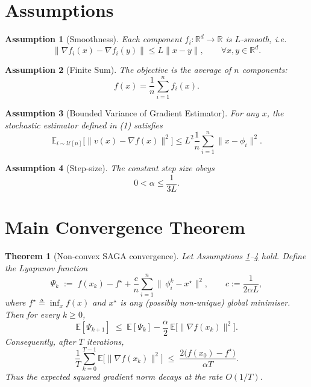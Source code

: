 \documentclass{article}
\newtheorem{theorem}{Theorem}
\newtheorem{assumption}{Assumption}
\newcommand{\E}{\mathbb{E}}
\newcommand{\R}{\mathbb{R}}
\begin{document}
\newpage
\section*{Assumptions}
\begin{assumption}[Smoothness]\label{as:smooth}
Each component $f_i:\R^{d}\to\R$ is $L$‑smooth, i.e.
\[
\|\nabla f_i(x)-\nabla f_i(y)\|\le L\|x-y\|,\qquad\forall x,y\in\R^{d}.
\tag{A1}
\]
\end{assumption}
\begin{assumption}[Finite Sum]\label{as:finite}
The objective is the average of $n$ components:
\[
f(x)=\frac1n\sum_{i=1}^{n}f_i(x).
\tag{A2}
\]
\end{assumption}
\begin{assumption}[Bounded Variance of Gradient Estimator]\label{as:var}
For any $x$, the stochastic estimator defined in (1) satisfies
\[
\E_{i\sim\mathcal{U}[n]}\bigl[\|v(x)-\nabla f(x)\|^{2}\bigr]
\le L^{2}\frac{1}{n}\sum_{i=1}^{n}\|x-\phi_i\|^{2}.
\tag{A3}
\]
\end{assumption}
\begin{assumption}[Step‑size]\label{as:stepsize}
The constant step size obeys
\[
0<\alpha\le \frac{1}{3L}.
\tag{A4}
\]
\end{assumption}

\section*{Main Convergence Theorem}
\begin{theorem}[Non‑convex SAGA convergence]\label{thm:main}
Let Assumptions \ref{as:smooth}–\ref{as:stepsize} hold. Define the Lyapunov function
\[
\Psi_k \;:=\; f(x_k)-f^{\star}
          +\frac{c}{n}\sum_{i=1}^{n}\|\,\phi_i^{k}-x^{\star}\|^{2},
\qquad c:=\frac{1}{2\alpha L},
\tag{4}
\]
where $f^{\star}\triangleq\inf_{x}f(x)$ and $x^{\star}$ is any (possibly non‑unique) global minimiser.
Then for every $k\ge0$,
\[
\E[\Psi_{k+1}]\;\le\;\E[\Psi_{k}]
          -\frac{\alpha}{2}\,\E\bigl[\|\nabla f(x_k)\|^{2}\bigr].
\tag{5}
\]
Consequently, after $T$ iterations,
\[
\frac{1}{T}\sum_{k=0}^{T-1}\E\!\bigl[\|\nabla f(x_k)\|^{2}\bigr]
   \;\le\;\frac{2\bigl(f(x_0)-f^{\star}\bigr)}{\alpha T}.
\tag{6}
\]
Thus the expected squared gradient norm decays at the rate $O(1/T)$.
\end{theorem}
\end{document}
